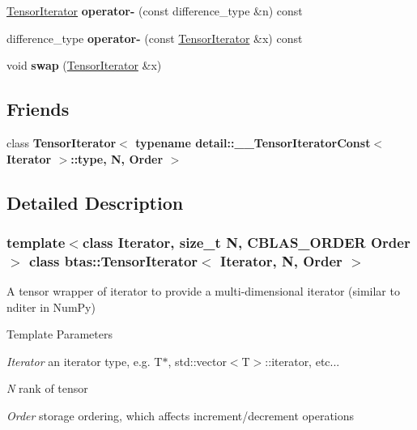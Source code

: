 \begin{DoxyCompactItemize}
\item 
\hypertarget{classbtas_1_1_tensor_iterator_a8ae5dac8b03340af9b42d2273739615f}{
\hyperlink{classbtas_1_1_tensor_iterator}{TensorIterator} {\bfseries operator-\/} (const difference\_\-type \&n) const }
\label{classbtas_1_1_tensor_iterator_a8ae5dac8b03340af9b42d2273739615f}

\item 
\hypertarget{classbtas_1_1_tensor_iterator_a13741e00fcce259e4c93e749cd527692}{
difference\_\-type {\bfseries operator-\/} (const \hyperlink{classbtas_1_1_tensor_iterator}{TensorIterator} \&x) const }
\label{classbtas_1_1_tensor_iterator_a13741e00fcce259e4c93e749cd527692}

\item 
\hypertarget{classbtas_1_1_tensor_iterator_a2765242cd95228679988e3b9e2f090e4}{
void {\bfseries swap} (\hyperlink{classbtas_1_1_tensor_iterator}{TensorIterator} \&x)}
\label{classbtas_1_1_tensor_iterator_a2765242cd95228679988e3b9e2f090e4}

\end{DoxyCompactItemize}
\subsection*{Friends}
\begin{DoxyCompactItemize}
\item 
\hypertarget{classbtas_1_1_tensor_iterator_a28486d507f52e4b0fff3183c2fb0f221}{
class {\bfseries TensorIterator$<$ typename detail::\_\-\_\-TensorIteratorConst$<$ Iterator $>$::type, N, Order $>$}}
\label{classbtas_1_1_tensor_iterator_a28486d507f52e4b0fff3183c2fb0f221}

\end{DoxyCompactItemize}


\subsection{Detailed Description}
\subsubsection*{template$<$class Iterator, size\_\-t N, CBLAS\_\-ORDER Order$>$ class btas::TensorIterator$<$ Iterator, N, Order $>$}

A tensor wrapper of iterator to provide a multi-\/dimensional iterator (similar to nditer in NumPy) 
\begin{DoxyTemplParams}{Template Parameters}
\item[{\em Iterator}]an iterator type, e.g. T$\ast$, std::vector$<$T$>$::iterator, etc... \item[{\em N}]rank of tensor \item[{\em Order}]storage ordering, which affects increment/decrement operations \end{DoxyTemplParams}


